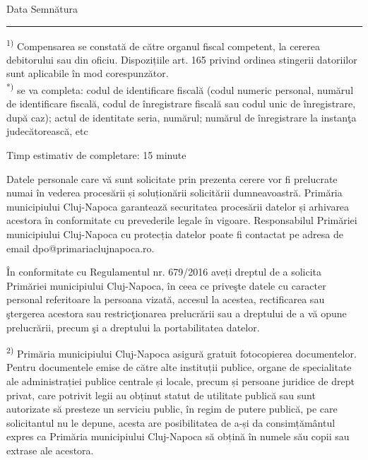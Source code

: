 \documentclass[11pt,a4paper]{article}
\newcommand{\fillline}[1][6cm]{\underline{\hspace{#1}}}
\begin{document}
\vspace{0.25cm}

Data \fillline[4cm] \hfill Semnătura \fillline[5cm]

\vspace{0.3cm}
\hrule
\vspace{0.2cm}

\scriptsize
\textsuperscript{1)} Compensarea se constată de către organul fiscal competent, la cererea debitorului sau din oficiu. Dispozițiile art. 165 privind ordinea stingerii datoriilor sunt aplicabile în mod corespunzător.\\
\textsuperscript{*)} se va completa: codul de identificare fiscală (codul numeric personal, numărul de identificare fiscală, codul de înregistrare fiscală sau codul unic de înregistrare, după caz); actul de identitate seria, numărul; numărul de înregistrare la instanţa judecătorească, etc

\vspace{0.3cm}

Timp estimativ de completare: 15 minute

\vspace{0.2cm}

Datele personale care vă sunt solicitate prin prezenta cerere vor fi prelucrate numai în vederea procesării și soluționării solicitării dumneavoastră. Primăria municipiului Cluj-Napoca garantează securitatea procesării datelor și arhivarea acestora în conformitate cu prevederile legale în vigoare. Responsabilul Primăriei municipiului Cluj-Napoca cu protecția datelor poate fi contactat pe adresa de email dpo@primariaclujnapoca.ro.

În conformitate cu Regulamentul nr. 679/2016 aveți dreptul de a solicita Primăriei municipiului Cluj-Napoca, în ceea ce priveşte datele cu caracter personal referitoare la persoana vizată, accesul la acestea, rectificarea sau ştergerea acestora sau restricţionarea prelucrării sau a dreptului de a vă opune prelucrării, precum şi a dreptului la portabilitatea datelor.

\textsuperscript{2)} Primăria municipiului Cluj-Napoca asigură gratuit fotocopierea documentelor. Pentru documentele emise de către alte instituții publice, organe de specialitate ale administrației publice centrale și locale, precum și persoane juridice de drept privat, care potrivit legii au obținut statut de utilitate publică sau sunt autorizate să presteze un serviciu public, în regim de putere publică, pe care solicitantul nu le depune, acesta are posibilitatea de a-și da consimțământul expres ca Primăria municipiului Cluj-Napoca să obțină în numele său copii sau extrase ale acestora.
\end{document}
